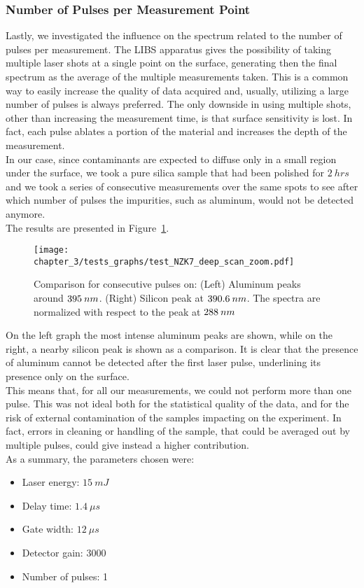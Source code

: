 \subsubsection{Number of Pulses per Measurement Point}
\label{subsec:number_pulses_mesurement}
Lastly, we investigated the influence on the spectrum related to the number of pulses per measurement. The LIBS apparatus gives the possibility of taking multiple laser shots at a single point on the surface, generating then the final spectrum as the average of the multiple measurements taken. This is a common way to easily increase the quality of data acquired and, usually, utilizing a large number of pulses is always preferred. The only downside in using multiple shots, other than increasing the measurement time, is that surface sensitivity is lost. In fact, each pulse ablates a portion of the material and increases the depth of the measurement.
\\ 
In our case, since contaminants are expected to diffuse only in a small region under the surface, we took a pure silica sample that had been polished for $2\:hrs$ and we took a series of consecutive measurements over the same spots to see after which number of pulses the impurities, such as aluminum, would not be detected anymore.
\\
The results are presented in Figure~\ref{fig:comparison_deep_scan}.
\begin{figure}[H]
    \centering
    \texttt{[image: chapter\_3/tests\_graphs/test\_NZK7\_deep\_scan\_zoom.pdf]} 
    \vspace*{-30pt}
    \caption[Comparison for consecutive pulses.]{Comparison for consecutive pulses on: (Left) Aluminum peaks around $\protect 395 \: nm$. (Right) Silicon peak at $\protect 390.6 \: nm$. The spectra are normalized with respect to the  peak at $\protect 288 \: nm$}
    \label{fig:comparison_deep_scan}
\end{figure}
On the left graph the most intense aluminum peaks are shown, while on the right, a nearby silicon peak is shown as a comparison. It is clear that the presence of aluminum cannot be detected after the first laser pulse, underlining its presence only on the surface. 
\\
This means that, for all our measurements, we could not perform more than one pulse. This was not ideal both for the statistical quality of the data, and for the risk of external contamination of the samples impacting on the experiment. In fact, errors in cleaning or handling of the sample, that could be averaged out by multiple pulses, could give instead a higher contribution.
\\
As a summary, the parameters chosen were:
\begin{itemize}
\item Laser energy: $15 \: mJ$
\item Delay time: $1.4 \: \mu s$
\item Gate width: $12 \: \mu s$
\item Detector gain: 3000
\item Number of pulses: 1
\end{itemize}


